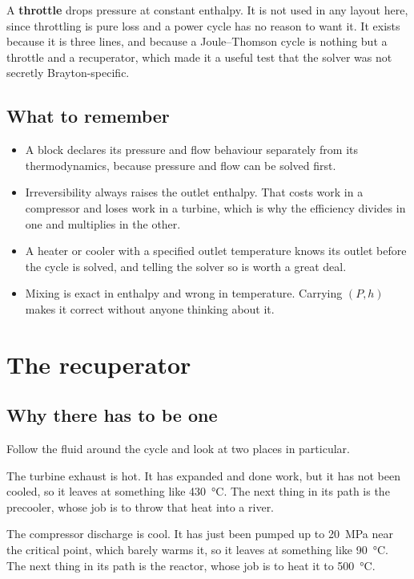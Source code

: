 \documentclass[11pt,a4paper]{report}
\begin{document}
A \textbf{throttle} drops pressure at constant enthalpy. It is not used in
any layout here, since throttling is pure loss and a power cycle has no
reason to want it. It exists because it is three lines, and because a
Joule--Thomson cycle is nothing but a throttle and a recuperator, which made
it a useful test that the solver was not secretly Brayton-specific.

\section{What to remember}

\begin{itemize}\itemsep2pt
\item A block declares its pressure and flow behaviour separately from its
      thermodynamics, because pressure and flow can be solved first.
\item Irreversibility always raises the outlet enthalpy. That costs work in
      a compressor and loses work in a turbine, which is why the efficiency
      divides in one and multiplies in the other.
\item A heater or cooler with a specified outlet temperature knows its
      outlet before the cycle is solved, and telling the solver so is worth
      a great deal.
\item Mixing is exact in enthalpy and wrong in temperature. Carrying
      $(P,h)$ makes it correct without anyone thinking about it.
\end{itemize}

\chapter{The recuperator}
\label{ch:recup}

\section{Why there has to be one}

Follow the fluid around the cycle and look at two places in particular.

The turbine exhaust is hot. It has expanded and done work, but it has not
been cooled, so it leaves at something like \SI{430}{\celsius}. The next
thing in its path is the precooler, whose job is to throw that heat into a
river.

The compressor discharge is cool. It has just been pumped up to
\SI{20}{\mega\pascal} near the critical point, which barely warms it, so it
leaves at something like \SI{90}{\celsius}. The next thing in its path is
the reactor, whose job is to heat it to \SI{500}{\celsius}.
\end{document}
